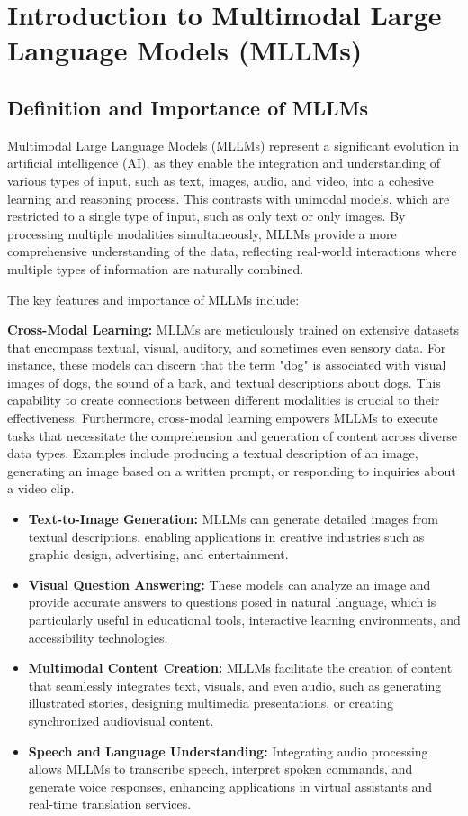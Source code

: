 \chapter{Introduction to Multimodal Large Language Models (MLLMs)}
\section{Definition and Importance of MLLMs}

Multimodal Large Language Models (MLLMs) represent a significant evolution in artificial intelligence (AI), as they enable the integration and understanding of various types of input, such as text, images, audio, and video, into a cohesive learning and reasoning process. This contrasts with unimodal models, which are restricted to a single type of input, such as only text or only images. By processing multiple modalities simultaneously, MLLMs provide a more comprehensive understanding of the data, reflecting real-world interactions where multiple types of information are naturally combined.

The key features and importance of MLLMs include:

\textbf{Cross-Modal Learning:} MLLMs are meticulously trained on extensive datasets that encompass textual, visual, auditory, and sometimes even sensory data. For instance, these models can discern that the term "dog" is associated with visual images of dogs, the sound of a bark, and textual descriptions about dogs. This capability to create connections between different modalities is crucial to their effectiveness. Furthermore, cross-modal learning empowers MLLMs to execute tasks that necessitate the comprehension and generation of content across diverse data types. Examples include producing a textual description of an image, generating an image based on a written prompt, or responding to inquiries about a video clip.

\begin{itemize}
    \item \textbf{Text-to-Image Generation:} MLLMs can generate detailed images from textual descriptions, enabling applications in creative industries such as graphic design, advertising, and entertainment.
    \item \textbf{Visual Question Answering:} These models can analyze an image and provide accurate answers to questions posed in natural language, which is particularly useful in educational tools, interactive learning environments, and accessibility technologies.
    \item \textbf{Multimodal Content Creation:} MLLMs facilitate the creation of content that seamlessly integrates text, visuals, and even audio, such as generating illustrated stories, designing multimedia presentations, or creating synchronized audiovisual content.
    \item \textbf{Speech and Language Understanding:} Integrating audio processing allows MLLMs to transcribe speech, interpret spoken commands, and generate voice responses, enhancing applications in virtual assistants and real-time translation services.
\end{itemize}


